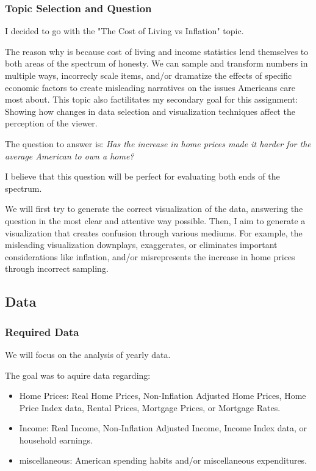 \documentclass{article}
\begin{document}
\subsubsection{Topic Selection and Question}

I decided to go with the "The Cost of Living vs Inflation" topic.

The reason why is because cost of living and income statistics lend themselves to 
both areas of the spectrum of honesty. We can sample and transform numbers 
in multiple ways, incorrecly scale items, and/or dramatize the effects of 
specific economic factors to create misleading narratives 
on the issues Americans care most about. This topic also factilitates my secondary goal
for this assignment: Showing how changes in data selection and visualization techniques
affect the perception of the viewer.

The question to answer is: 
\textit{Has the increase in home prices made it harder for the average American to own a home?}

I believe that this question will be perfect for evaluating both ends of the spectrum.

We will first try to generate the correct visualization of the data, answering the question
in the most clear and attentive way possible. Then, I aim to generate a visualization 
that creates confusion through various mediums. For example, the misleading visualization 
downplays, exaggerates, or eliminates important considerations like inflation,
and/or misrepresents the increase in home prices through incorrect sampling.

\subsection{Data}
\subsubsection{Required Data}
We will focus on the analysis of yearly data.

The goal was to aquire data regarding:
\begin{itemize}
  \item Home Prices: Real Home Prices, Non-Inflation Adjusted Home Prices, Home Price
  Index data, Rental Prices, Mortgage Prices, or Mortgage Rates.
  \item Income: Real Income, Non-Inflation Adjusted Income, Income Index data, or 
  household earnings.
  \item miscellaneous: American spending habits and/or miscellaneous expenditures.
\end{itemize}
\end{document}
